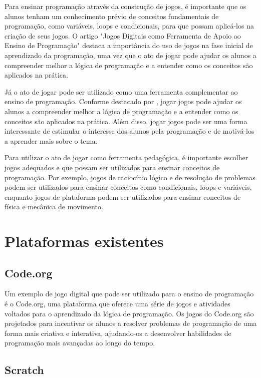 Para ensinar programação através da construção de jogos, é importante que os alunos tenham um conhecimento prévio de conceitos fundamentais de programação, como variáveis, loops e condicionais, para que possam aplicá-los na criação de seus jogos. O artigo "Jogos Digitais como Ferramenta de Apoio ao Ensino de Programação" \cite{Pereira2016} destaca a importância do uso de jogos na fase inicial de aprendizado da programação, uma vez que o ato de jogar pode ajudar os alunos a compreender melhor a lógica de programação e a entender como os conceitos são aplicados na prática.

Já o ato de jogar pode ser utilizado como uma ferramenta complementar ao ensino de programação. Conforme destacado por \cite{Pereira2016}, jogar jogos pode ajudar os alunos a compreender melhor a lógica de programação e a entender como os conceitos são aplicados na prática. Além disso, jogar jogos pode ser uma forma interessante de estimular o interesse dos alunos pela programação e de motivá-los a aprender mais sobre o tema.

Para utilizar o ato de jogar como ferramenta pedagógica, é importante escolher jogos adequados e que possam ser utilizados para ensinar conceitos de programação. Por exemplo, jogos de raciocínio lógico e de resolução de problemas podem ser utilizados para ensinar conceitos como condicionais, loops e variáveis, enquanto jogos de plataforma podem ser utilizados para ensinar conceitos de física e mecânica de movimento.

\section{Plataformas existentes}

\subsection{Code.org}

Um exemplo de jogo digital que pode ser utilizado para o ensino de programação é o Code.org, uma plataforma que oferece uma série de jogos e atividades voltados para o aprendizado da lógica de programação. Os jogos do Code.org são projetados para incentivar os alunos a resolver problemas de programação de uma forma mais criativa e interativa, ajudando-os a desenvolver habilidades de programação mais avançadas ao longo do tempo.

\subsection{Scratch}

